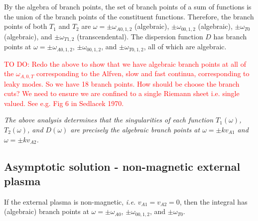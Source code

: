 \documentclass[12pt]{article}
\begin{document}
By the algebra of branch points, the set of branch points of a sum of functions is the union of the branch points of the constituent functions. Therefore, the branch points of both $T_1$ and $T_2$ are $\omega = \pm \omega_{A0,1,2}$ (algebraic), $\pm \omega_{00,1,2}$ (algebraic), $\pm \omega_{T0}$ (algebraic), and $\pm \omega_{T1,2}$ (transcendental). The dispersion function $D$ has branch points at $\omega = \pm \omega_{A0,1,2}$, $\pm \omega_{00,1,2}$, and $\pm \omega_{T0,1,2}$, all of which are algebraic.

\textcolor{red}{TO DO: Redo the above to show that we have algebraic branch points at all of the $\omega_{A,0,T}$ corresponding to the Alfven, slow and fast continua, corresponding to leaky modes. So we have 18 branch points. How should be choose the branch cuts? We need to ensure we are confined to a single Riemann sheet i.e. single valued. See e.g. Fig 6 in Sedlacek 1970.}

\textit{The above analysis determines that the singularities of each function $T_1(\omega)$, $T_2(\omega)$, and $D(\omega)$ are precisely the algebraic branch points at $\omega = \pm kv_{A1}$ and $\omega = \pm kv_{A2}$.}

\subsection{Asymptotic solution - non-magnetic external plasma}
If the external plasma is non-magnetic, \textit{i.e.} $v_{A1} = v_{A2} = 0$, then the integral has (algebraic) branch points at $\omega = \pm \omega_{A0}$, $\pm \omega_{00,1,2}$, and $\pm \omega_{T0}$.
\end{document}
